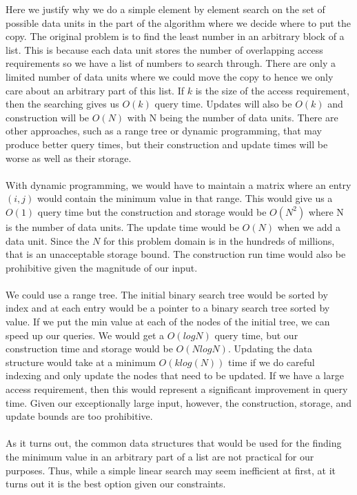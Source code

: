 Here we justify why we do a simple element by element search on the set of possible data units in the part of the algorithm where we decide where to put the copy. The original problem is to find the least number  in an arbitrary block of a list. This is because each data unit stores the number of overlapping access requirements so we have a list of numbers to search through. There are only a limited number of data units where we could move the copy to hence we only care about an arbitrary part of this list. If $k$ is the size of the access requirement, then the searching gives us $O(k)$ query time. Updates will also be $O(k)$ and construction will be $O(N)$ with N being the number of data units. There are other approaches, such as a range tree or dynamic programming, that may produce better query times, but their construction and update times will be worse as well as their storage. \\
\\
With dynamic programming, we would have to maintain a matrix where an entry
$(i,j)$ would contain the minimum value in that range. This would give us a
$O(1)$ query time but the construction and storage would be $O(N^2)$ where N is
the number of data units. The update time would be $O(N)$ when we add a data
unit. Since the $N$ for this problem domain is in the hundreds of millions,
that is an unacceptable storage bound. The construction run time would also be
prohibitive given the magnitude of our input. \\
\\
We could use a range tree. The initial binary search tree would be sorted by
index and at each entry would be a pointer to a binary search tree sorted by
value. If we put the min value at each of the nodes of the initial tree, we can
speed up our queries. We would get a $O(log N)$ query time, but our
construction time and storage would be $O(N log N)$. Updating the data
structure would take at a minimum $O(k log(N))$ time if we do careful indexing
and only update the nodes that need to be updated. If we have a large access
requirement, then this would represent a significant improvement in query time.
Given our exceptionally large input, however, the construction, storage, and
update bounds are too prohibitive.  \\
\\
As it turns out, the common data structures that would be used for the finding the minimum value in an arbitrary part of a list are not practical for our purposes. Thus, while a simple linear search may seem inefficient at first, at it turns out it is the best option given our constraints. 
